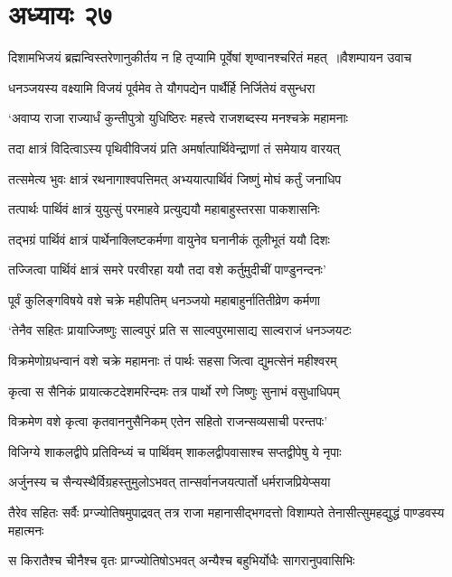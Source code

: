 \chapter{अध्यायः २७}
\threelineshloka
{दिशामभिजयं ब्रह्मन्विस्तरेणानुकीर्तय}
{न हि तृप्यामि पूर्वेषां शृण्वानश्चरितं महत् ॥वैशम्पायन उवाच}
{}


\twolineshloka
{धनञ्जयस्य वक्ष्यामि विजयं पूर्वमेव ते}
{यौगपद्येन पार्थैर्हि निर्जितेयं वसुन्धरा}


\twolineshloka
{`अवाप्य राजा राज्यार्धं कुन्तीपुत्रो युधिष्ठिरः}
{महत्त्वे राजशब्दस्य मनश्चक्रे महामनाः}


\twolineshloka
{तदा क्षात्रं विदित्वाऽस्य पृथिवीविजयं प्रति}
{अमर्षात्पार्थिवेन्द्राणां तं समेयाय वारयत्}


\twolineshloka
{तत्समेत्य भुवः क्षात्रं रथनागाश्वपत्तिमत्}
{अभ्ययात्पार्थिवं जिष्णुं मोघं कर्तुं जनाधिप}


\twolineshloka
{तत्पार्थः पार्थिवं क्षात्रं युयुत्सुं परमाहवे}
{प्रत्युद्ययौ महाबाहुस्तरसा पाकशासनिः}


\twolineshloka
{तद्भग्रं पार्थिवं क्षात्रं पार्थेनाक्लिष्टकर्मणा}
{वायुनेव घनानीकं तूलीभूतं ययौ दिशः}


\twolineshloka
{तज्जित्वा पार्थिवं क्षात्रं समरे परवीरहा}
{ययौ तदा वशे कर्तुमुदीचीं पाण्डुनन्दनः'}


\twolineshloka
{पूर्वं कुलिङ्गविषये वशे चक्रे महीपतिम्}
{धनञ्जयो महाबाहुर्नातितीव्रेण कर्मणा}


\twolineshloka
{`तेनैव सहितः प्रायाज्जिष्णुः साल्वपुरं प्रति}
{स साल्वपुरमासाद्य साल्वराजं धनञ्जयटः}


\twolineshloka
{विक्रमेणोग्रधन्वानं वशे चक्रे महामनाः}
{तं पार्थः सहसा जित्वा द्युमत्सेनं महीश्वरम्}


\twolineshloka
{कृत्वा स सैनिकं प्रायात्कटदेशमरिन्दमः}
{तत्र पार्थो रणे जिष्णुः सुनाभं वसुधाधिपम्}


\twolineshloka
{विक्रमेण वशे कृत्वा कृतवाननुसैनिकम्}
{एतेन सहितो राजन्सव्यसाची परन्तपः'}


\twolineshloka
{विजिग्ये शाकलद्वीपे प्रतिविन्ध्यं च पार्थिवम्}
{शाकलद्वीपवासाश्च सप्तद्वीपेषु ये नृपाः}


\twolineshloka
{अर्जुनस्य च सैन्यस्थैर्विग्रहस्तुमुलोऽभवत्}
{तान्सर्वानजयत्पार्तो धर्मराजप्रियेप्सया}


तैरेव सहितः सर्वैः प्रग्ज्योतिषमुपाद्रवत्
\twolineshloka
{तत्र राजा महानासीद्भगदत्तो विशाम्पते}
{तेनासीत्सुमहद्युद्धं पाण्डवस्य महात्मनः}


\twolineshloka
{स किरातैश्च चीनैश्च वृतः प्राग्ज्योतिषोऽभवत्}
{अन्यैश्च बहुभिर्योधैः सागरानुपवासिभिः}


